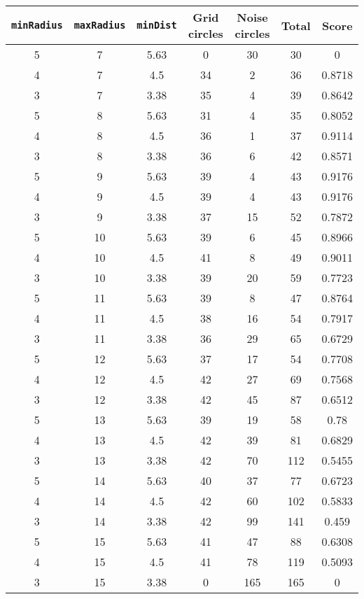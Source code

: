 \documentclass[letterpaper, 12pt]{article}
\begin{document}
\begin{longtable}{|c|c|c|c|c|c|c|}
\hline
\textbf{\texttt{minRadius}} & \textbf{\texttt{maxRadius}} & \textbf{\texttt{minDist}} & \textbf{Grid circles} & \textbf{Noise circles} & \textbf{Total} & \textbf{Score} \\
\hline
5 & 7 & 5.63 & 0 & 30 & 30 & 0 \\
\hline
4 & 7 & 4.5 & 34 & 2 & 36 & 0.8718 \\
\hline
3 & 7 & 3.38 & 35 & 4 & 39 & 0.8642 \\
\hline
5 & 8 & 5.63 & 31 & 4 & 35 & 0.8052 \\
\hline
4 & 8 & 4.5 & 36 & 1 & 37 & 0.9114 \\
\hline
3 & 8 & 3.38 & 36 & 6 & 42 & 0.8571 \\
\hline
5 & 9 & 5.63 & 39 & 4 & 43 & 0.9176 \\
\hline
4 & 9 & 4.5 & 39 & 4 & 43 & 0.9176 \\
\hline
3 & 9 & 3.38 & 37 & 15 & 52 & 0.7872 \\
\hline
5 & 10 & 5.63 & 39 & 6 & 45 & 0.8966 \\
\hline
4 & 10 & 4.5 & 41 & 8 & 49 & 0.9011 \\
\hline
3 & 10 & 3.38 & 39 & 20 & 59 & 0.7723 \\
\hline
5 & 11 & 5.63 & 39 & 8 & 47 & 0.8764 \\
\hline
4 & 11 & 4.5 & 38 & 16 & 54 & 0.7917 \\
\hline
3 & 11 & 3.38 & 36 & 29 & 65 & 0.6729 \\
\hline
5 & 12 & 5.63 & 37 & 17 & 54 & 0.7708 \\
\hline
4 & 12 & 4.5 & 42 & 27 & 69 & 0.7568 \\
\hline
3 & 12 & 3.38 & 42 & 45 & 87 & 0.6512 \\
\hline
5 & 13 & 5.63 & 39 & 19 & 58 & 0.78 \\
\hline
4 & 13 & 4.5 & 42 & 39 & 81 & 0.6829 \\
\hline
3 & 13 & 3.38 & 42 & 70 & 112 & 0.5455 \\
\hline
5 & 14 & 5.63 & 40 & 37 & 77 & 0.6723 \\
\hline
4 & 14 & 4.5 & 42 & 60 & 102 & 0.5833 \\
\hline
3 & 14 & 3.38 & 42 & 99 & 141 & 0.459 \\
\hline
5 & 15 & 5.63 & 41 & 47 & 88 & 0.6308 \\
\hline
4 & 15 & 4.5 & 41 & 78 & 119 & 0.5093 \\
\hline
3 & 15 & 3.38 & 0 & 165 & 165 & 0 \\

\end{longtable}
\end{document}
